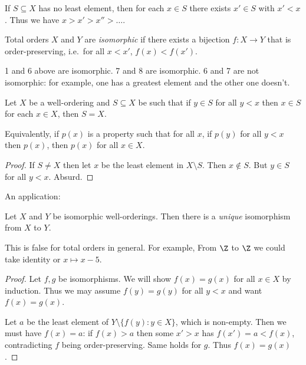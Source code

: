 \documentclass[a4paper]{article}
\begin{document}
\begin{corollary}
  If \(S \subseteq X\) has no least element, then for each \(x \in S\) there exists \(x' \in S\) with \(x' < x\). Thus we have \(x > x' > x'' > \dots\).
\end{corollary}

\begin{definition}
  Total orders \(X\) and \(Y\) are \emph{isomorphic} if there exists a bijection \(f: X \to Y\) that is order-preserving, i.e.\ for all \(x < x'\), \(f(x) < f(x')\).
\end{definition}

\begin{eg}
  1 and 6 above are isomorphic. 7 and 8 are isomorphic. 6 and 7 are not isomorphic: for example, one has a greatest element and the other one doesn't.
\end{eg}

\begin{proposition}
  Let \(X\) be a well-ordering and \(S \subseteq X\) be such that if \(y \in S\) for all \(y < x\) then \(x \in S\) for each \(x \in X\), then \(S = X\).

  Equivalently, if \(p(x)\) is a property such that for all \(x\), if \(p(y)\) for all \(y < x\) then \(p(x)\), then \(p(x)\) for all \(x \in X\).
\end{proposition}

\begin{proof}
  If \(S \neq X\) then let \(x\) be the least element in \(X \setminus S\). Then \(x \notin S\). But \(y \in S\) for all \(y < x\). Absurd.
\end{proof}

An application:

\begin{proposition}
  Let \(X\) and \(Y\) be isomorphic well-orderings. Then there is a \emph{unique} isomorphism from \(X\) to \(Y\).
\end{proposition}

\begin{remark}
  This is false for total orders in general. For example, From \(\Z\) to \(\Z\) we could take identity or \(x \mapsto x - 5\).
\end{remark}

\begin{proof}
  Let \(f, g\) be isomorphisms. We will show \(f(x) = g(x)\) for all \(x \in X\) by induction. Thus we may assume \(f(y) = g(y)\) for all \(y < x\) and want \(f(x) = g(x)\).

  Let \(a\) be the least element of \(Y \setminus \{f(y): y \in X\}\), which is non-empty. Then we must have \(f(x) = a\): if \(f(x) > a\) then some \(x' > x\) has \(f(x') = a < f(x)\), contradicting \(f\) being order-preserving. Same holds for \(g\). Thus \(f(x) = g(x)\).
\end{proof}
\end{document}
